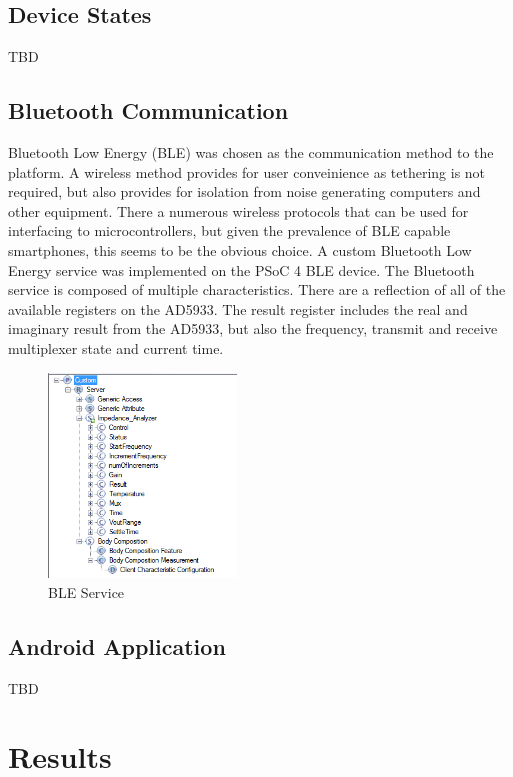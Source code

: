 \documentclass[]{IEEEtran}
\begin{document}
\subsection{Device States}
TBD
\subsection{Bluetooth Communication}

Bluetooth Low Energy (BLE) was chosen as the communication method to the platform. A wireless method provides for user conveinience as tethering is not required, but also provides for isolation from noise generating computers and other equipment. There a numerous wireless protocols that can be used for interfacing to microcontrollers, but given the prevalence of BLE capable smartphones, this seems to be the obvious choice. A custom Bluetooth Low Energy service was implemented on the PSoC 4 BLE device. The Bluetooth service is composed of multiple characteristics. There are a reflection of all of the available registers on the AD5933. The result register includes the real and imaginary result from the AD5933, but also the frequency, transmit and receive multiplexer state and current time. 

\begin{figure} %
\centering
\includegraphics[width=5cm ]{../graphics/ble_service.png}
\centering
\caption{BLE Service}
\label{fig:ble}
\end{figure}



\subsection{Android Application}
TBD


\section{Results}
\end{document}
